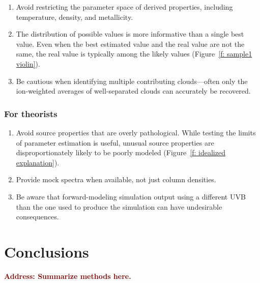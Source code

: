 \documentclass[fleqn,usenatbib]{mnras}
\newcommand{\todo}[1]{\textcolor{Maroon}{\textbf{Address: #1}}}
\begin{document}
\begin{enumerate}
    \item Avoid restricting the parameter space of derived properties, including temperature, density, and metallicity. 
    \item The distribution of possible values is more informative than a single best value. Even when the best estimated value and the real value are not the same, the real value is typically among the likely values (Figure~\ref{f: sample1 violin}).
    \item Be cautious when identifying multiple contributing clouds---often only the ion-weighted averages of well-separated clouds can accurately be recovered.
\end{enumerate}

\subsubsection{For theorists}

\begin{enumerate}
    \item Avoid source properties that are overly pathological. While testing the limits of  parameter estimation is useful, unusual source properties are disproportionately likely to be poorly modeled (Figure~\ref{f: idealized explanation}).
    \item Provide mock spectra when available, not just column densities.
    \item Be aware that forward-modeling simulation output using a different UVB than the one used to produce the simulation can have undesirable consequences.
\end{enumerate}

\section{Conclusions}
\label{s: conclusions}

\todo{Summarize methods here.}
\end{document}
